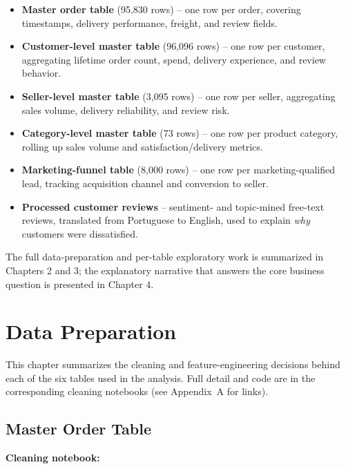 \documentclass[11pt,a4paper]{report}
\begin{document}
\begin{itemize}[leftmargin=2em]
    \item \textbf{Master order table} (95{,}830 rows) -- one row per order, covering timestamps,
        delivery performance, freight, and review fields.
    \item \textbf{Customer-level master table} (96{,}096 rows) -- one row per customer, aggregating
        lifetime order count, spend, delivery experience, and review behavior.
    \item \textbf{Seller-level master table} (3{,}095 rows) -- one row per seller, aggregating
        sales volume, delivery reliability, and review risk.
    \item \textbf{Category-level master table} (73 rows) -- one row per product category, rolling
        up sales volume and satisfaction/delivery metrics.
    \item \textbf{Marketing-funnel table} (8{,}000 rows) -- one row per marketing-qualified lead,
        tracking acquisition channel and conversion to seller.
    \item \textbf{Processed customer reviews} -- sentiment- and topic-mined free-text reviews,
        translated from Portuguese to English, used to explain \textit{why} customers were
        dissatisfied.
\end{itemize}

The full data-preparation and per-table exploratory work is summarized in Chapters 2 and 3; the
explanatory narrative that answers the core business question is presented in Chapter 4.

\clearpage

\chapter{Data Preparation}

This chapter summarizes the cleaning and feature-engineering decisions behind each of the six
tables used in the analysis. Full detail and code are in the corresponding cleaning notebooks
(see Appendix~A for links).

\section{Master Order Table}
\textbf{Cleaning notebook:} 
\end{document}
